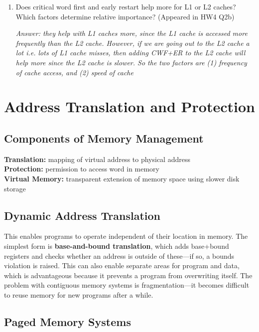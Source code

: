 \documentclass{article}
\begin{document}
\begin{enumerate}
\item Does critical word first and early restart help more for L1 or L2 caches? Which factors determine relative importance? (Appeared in HW4 Q2b)

\textit{Answer: they help with L1 caches more, since the L1 cache is accessed more frequently than the L2 cache. However, if we are going out to the L2 cache a lot i.e. lots of L1 cache misses, then adding CWF+ER to the L2 cache will help more since the L2 cache is slower. So the two factors are (1) frequency of cache access, and (2) speed of cache}

\end{enumerate}

\section{Address Translation and Protection}

\subsection{Components of Memory Management}

\textbf{Translation:} mapping of virtual address to physical address \\
\textbf{Protection:} permission to access word in memory \\ 
\textbf{Virtual Memory:} transparent extension of memory space using slower disk storage 

\subsection{Dynamic Address Translation}

This enables programs to operate independent of their location in memory. The simplest form is \textbf{base-and-bound translation}, which adds base+bound registers and checks whether an address is outside of these---if so, a bounds violation is raised. This can also enable separate areas for program and data, which is advantageous because it prevents a program from overwriting itself. The problem with contiguous memory systems is fragmentation---it becomes difficult to reuse memory for new programs after a while.

\subsection{Paged Memory Systems}
\end{document}
